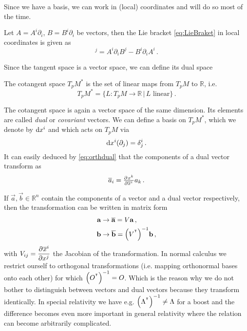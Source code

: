 Since we have a basis, we can work in (local) coordinates and will do so most of
the time.
\begin{example}
Let $A=A^i\partial_i$, $B=B^i\partial_i$ be vectors, then the Lie bracket
\eqref{eq:LieBraket} in local coordinates is given as
\begin{equation}
    [A,B]^j=A^i\partial_iB^j-B^i\partial_iA^i\, .
\end{equation}
\end{example}
Since the tangent space is a vector space, we can define its dual space
\begin{definition} The cotangent space $T_pM^*$ is the set of
linear maps from $T_pM$ to $\mathbb{R}$, i.e.
\begin{equation}
    T_pM^*=\{L:T_pM\to \mathbb{R}\, |\, L \text{ linear}\}\, .
\end{equation}
\end{definition}
The cotangent space is again a vector space of the same dimension. Its elements
are called \emph{dual} or \emph{covariant} vectors.
We can define a basis on $	T_pM^*$, which we denote by $\dif x^i$ and  which acts on $T_pM$ via
\begin{equation}
    \dif x^i(\partial_j)=\delta^i_j\, . \label{eq:orthdual}
\end{equation}
It can easily deduced by \eqref{eq:orthdual} that the components of a dual vector transform as
\begin{equation}
    \overline{a}_i=\pd{x^k}{{\overline{x}^i}}a_k\, .
\end{equation}
\begin{remark}
If $\vec{a},\vec{b}\in\mathbb{R}^n$ contain the components of a vector and a
dual vector respectively, then the transformation can be written in matrix form
\begin{align}
    \vec{a}&\to\overline{\vec{a}}= V\vec{a}\, ,\\
    \vec{b}&\to\overline{\vec{b}}=\left(V\transpose\right)^{-1}\vec{b}\, ,
\end{align}
with $V_{ij}=\dpd{\overline{x}^i}{{x^j}}$ the
Jacobian of the transformation.
In normal calculus we restrict ourself to orthogonal transformations (i.e.
mapping orthonormal bases onto each other) for which
$\left(O\transpose\right)^{-1}=O$.
Which is the reason why we do not bother to distinguish between vectors and dual vectors because they transform identically. 
In special relativity we have e.g.
$\left(\Lambda\transpose\right)^{-1}\neq\Lambda$ for a boost and the difference
becomes even more important in general relativity where the relation can become arbitrarily complicated.
\end{remark}
